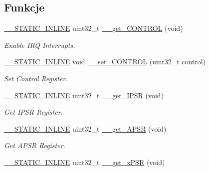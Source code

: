 \subsection*{Funkcje}
\begin{DoxyCompactItemize}
\item 
\hyperlink{cmsis__iccarm_8h_aba87361bfad2ae52cfe2f40c1a1dbf9c}{\+\_\+\+\_\+\+S\+T\+A\+T\+I\+C\+\_\+\+I\+N\+L\+I\+NE} uint32\+\_\+t \hyperlink{group___c_m_s_i_s___core___reg_acc_functions_ga7dd5c942bee32f055b90153feb950f59}{\+\_\+\+\_\+get\+\_\+\+C\+O\+N\+T\+R\+OL} (void)
\begin{DoxyCompactList}\small\item\em Enable I\+RQ Interrupts. \end{DoxyCompactList}\item 
\hyperlink{cmsis__iccarm_8h_aba87361bfad2ae52cfe2f40c1a1dbf9c}{\+\_\+\+\_\+\+S\+T\+A\+T\+I\+C\+\_\+\+I\+N\+L\+I\+NE} void \hyperlink{group___c_m_s_i_s___core___reg_acc_functions_ga0102d0939d9b26c5c792be6bf5fd550f}{\+\_\+\+\_\+set\+\_\+\+C\+O\+N\+T\+R\+OL} (uint32\+\_\+t control)
\begin{DoxyCompactList}\small\item\em Set Control Register. \end{DoxyCompactList}\item 
\hyperlink{cmsis__iccarm_8h_aba87361bfad2ae52cfe2f40c1a1dbf9c}{\+\_\+\+\_\+\+S\+T\+A\+T\+I\+C\+\_\+\+I\+N\+L\+I\+NE} uint32\+\_\+t \hyperlink{group___c_m_s_i_s___core___reg_acc_functions_gaf15a71855b9d731d11de92704c82bd18}{\+\_\+\+\_\+get\+\_\+\+I\+P\+SR} (void)
\begin{DoxyCompactList}\small\item\em Get I\+P\+SR Register. \end{DoxyCompactList}\item 
\hyperlink{cmsis__iccarm_8h_aba87361bfad2ae52cfe2f40c1a1dbf9c}{\+\_\+\+\_\+\+S\+T\+A\+T\+I\+C\+\_\+\+I\+N\+L\+I\+NE} uint32\+\_\+t \hyperlink{group___c_m_s_i_s___core___reg_acc_functions_gadff4f1e599946e8ae96fba17b5245f04}{\+\_\+\+\_\+get\+\_\+\+A\+P\+SR} (void)
\begin{DoxyCompactList}\small\item\em Get A\+P\+SR Register. \end{DoxyCompactList}\item 
\hyperlink{cmsis__iccarm_8h_aba87361bfad2ae52cfe2f40c1a1dbf9c}{\+\_\+\+\_\+\+S\+T\+A\+T\+I\+C\+\_\+\+I\+N\+L\+I\+NE} uint32\+\_\+t \hyperlink{group___c_m_s_i_s___core___reg_acc_functions_ga52ca795dc9429ee0ac64ddd12c034834}{\+\_\+\+\_\+get\+\_\+x\+P\+SR} (void)

\end{DoxyCompactItemize}
